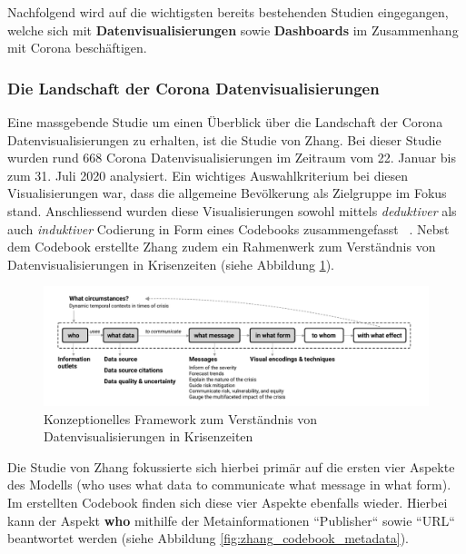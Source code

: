 Nachfolgend wird auf die wichtigsten bereits bestehenden Studien eingegangen, welche sich mit  \textbf{Datenvisualisierungen} sowie \textbf{Dashboards} im Zusammenhang mit Corona beschäftigen.
 
 \subsubsection{Die Landschaft der Corona Datenvisualisierungen} \label{ch:introduction_landscape_of_covid_datavisualizations} \label{ch:landscape_of_covid_data_visualization}
 Eine massgebende Studie um einen Überblick über die Landschaft der Corona Datenvisualisierungen zu erhalten, ist die Studie von Zhang. Bei dieser Studie wurden rund 668 Corona Datenvisualisierungen im Zeitraum vom 22. Januar bis zum 31. Juli 2020 analysiert. Ein wichtiges Auswahlkriterium bei diesen Visualisierungen war, dass die allgemeine Bevölkerung als Zielgruppe im Fokus stand. Anschliessend wurden diese Visualisierungen sowohl mittels \textit{deduktiver} als auch \textit{induktiver} Codierung in Form eines Codebooks zusammengefasst ~\citep[S. 3]{yixuan_zhang}. Nebst dem Codebook erstellte Zhang zudem ein Rahmenwerk zum Verständnis von Datenvisualisierungen in Krisenzeiten (siehe Abbildung \ref{fig:zhang_conceptual_framework}).
 
 
 \begin{figure}[ht]
    \includegraphics[width=12cm]{images/zhang_conceptual_framework.png}
    \centering
    \caption{Konzeptionelles Framework zum Verständnis von Datenvisualisierungen in Krisenzeiten ~\citep[S. 4]{yixuan_zhang}}
    \label{fig:zhang_conceptual_framework}
\end{figure}
 
 
 Die Studie von Zhang fokussierte sich hierbei primär auf die ersten vier Aspekte des Modells (who uses what data to communicate what message in what form). Im erstellten Codebook finden sich diese vier Aspekte ebenfalls wieder. Hierbei kann der Aspekt \textbf{who} mithilfe der Metainformationen ``Publisher`` sowie ``URL`` beantwortet werden (siehe Abbildung \ref{fig:zhang_codebook_metadata}).
 
